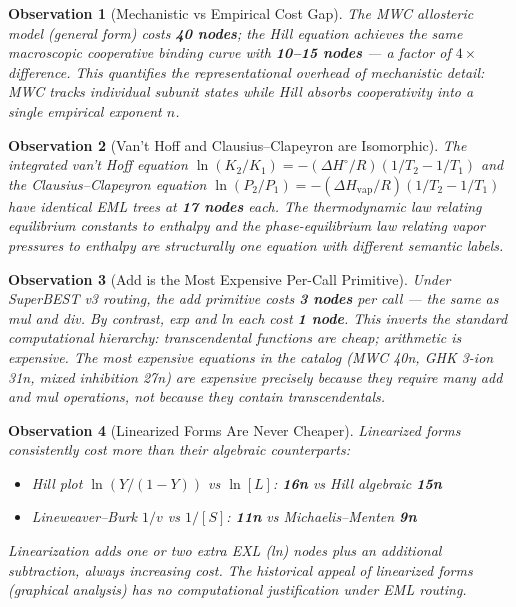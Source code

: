 \documentclass[12pt,a4paper]{article}
\newtheorem{observation}{Observation}[section]
\theoremstyle{definition}
\begin{document}
\begin{observation}[Mechanistic vs Empirical Cost Gap]
\label{obs:mwc-hill}
The MWC allosteric model (general form) costs \textbf{40 nodes}; the Hill
equation achieves the same macroscopic cooperative binding curve with
\textbf{10--15 nodes} --- a factor of $4\times$ difference.  This
quantifies the representational overhead of mechanistic detail: MWC
tracks individual subunit states while Hill absorbs cooperativity into
a single empirical exponent $n$.
\end{observation}

\begin{observation}[Van't Hoff and Clausius--Clapeyron are Isomorphic]
\label{obs:isomorphic}
The integrated van't Hoff equation
$\ln(K_2/K_1) = -(\Delta H^\circ/R)(1/T_2 - 1/T_1)$
and the Clausius--Clapeyron equation
$\ln(P_2/P_1) = -(\Delta H_\mathrm{vap}/R)(1/T_2 - 1/T_1)$
have identical EML trees at \textbf{17 nodes} each.
The thermodynamic law relating equilibrium constants to enthalpy
and the phase-equilibrium law relating vapor pressures to enthalpy
are structurally one equation with different semantic labels.
\end{observation}

\begin{observation}[Add is the Most Expensive Per-Call Primitive]
\label{obs:add-cost}
Under SuperBEST v3 routing, the add primitive costs \textbf{3 nodes} per
call --- the same as mul and div.  By contrast, exp and ln each cost
\textbf{1 node}.  This inverts the standard computational hierarchy:
transcendental functions are cheap; arithmetic is expensive.
The most expensive equations in the catalog (MWC 40n, GHK 3-ion 31n,
mixed inhibition 27n) are expensive precisely because they require many add
and mul operations, not because they contain transcendentals.
\end{observation}

\begin{observation}[Linearized Forms Are Never Cheaper]
\label{obs:linearized}
Linearized forms consistently cost \emph{more} than their algebraic
counterparts:
\begin{itemize}[noitemsep]
\item Hill plot $\ln(Y/(1-Y))$ vs $\ln[L]$: \textbf{16n} vs Hill algebraic \textbf{15n}
\item Lineweaver--Burk $1/v$ vs $1/[S]$: \textbf{11n} vs Michaelis--Menten \textbf{9n}
\end{itemize}
Linearization adds one or two extra EXL (ln) nodes plus an additional
subtraction, always increasing cost.  The historical appeal of linearized
forms (graphical analysis) has no computational justification under EML routing.
\end{observation}
\end{document}
